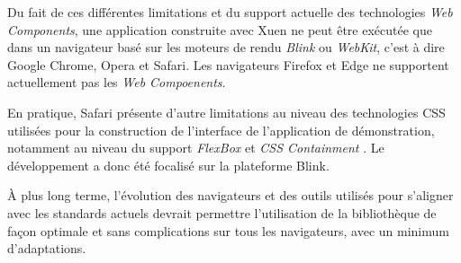 Du fait de ces différentes limitations et du support actuelle des technologies \emph{Web Components}, une application construite avec Xuen ne peut être exécutée que dans un navigateur basé sur les moteurs de rendu \emph{Blink} ou \emph{WebKit}, c'est à dire Google Chrome, Opera et Safari. Les navigateurs Firefox et Edge ne supportent actuellement pas les \emph{Web Compoenents}.

En pratique, Safari présente d'autre limitations au niveau des technologies CSS utilisées pour la construction de l'interface de l'application de démonstration, notamment au niveau du support \emph{FlexBox} \cite{w3c-css-flexbox} et \emph{CSS Containment} \cite{w3c-css-contain}. Le développement a donc été focalisé sur la plateforme Blink.

À plus long terme, l'évolution des navigateurs et des outils utilisés pour s'aligner avec les standards actuels devrait permettre l'utilisation de la bibliothèque de façon optimale et sans complications sur tous les navigateurs, avec un minimum d'adaptations.